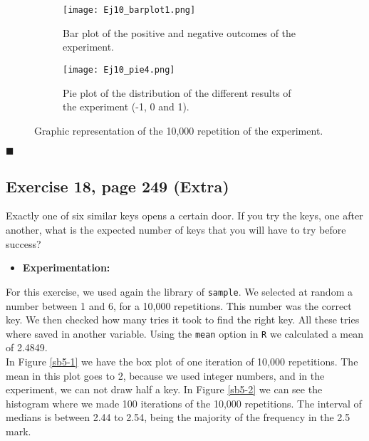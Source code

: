 \documentclass{article}
\begin{document}
\begin{figure}[]
\begin{subfigure}{.5\textwidth}
  \centering
  \texttt{[image: Ej10\_barplot1.png]}  
  \caption{Bar plot of the positive and negative outcomes of the experiment. }
  \label{sb4-1}
\end{subfigure}\hspace{5mm}%
\begin{subfigure}{.5\textwidth}
  \centering
  \texttt{[image: Ej10\_pie4.png]}  
  \caption{Pie plot of the distribution of the different results of the experiment (-1, 0 and 1).}
  \label{sb4-2}
\end{subfigure}
	\caption{Graphic representation of the 10,000 repetition of the experiment. }
\label{fig4}
\end{figure}

\begin{flushright}
$\blacksquare$
\end{flushright}

\subsection{Exercise 18, page 249 (Extra)}

Exactly one of six similar keys opens a certain door. If you try the keys, one after another, what is the expected number of keys that you will have to try before success?\\


\begin{itemize}
\item \textbf{Experimentation:}
\end{itemize}

For this exercise, we used again the library of \texttt{sample}. We selected at random a number between 1 and 6, for a 10,000 repetitions. This number was the correct key. We then checked how many tries it took to find the right key. All these tries where saved in another variable. Using the \texttt{mean} option in \texttt{R} we calculated a mean of 2.4849. \\

In Figure \ref{sb5-1} we have the box plot of one iteration of 10,000 repetitions. The mean in this plot goes to 2, because we used integer numbers, and in the experiment, we can not draw half a key. In Figure \ref{sb5-2} we can see the histogram where we made 100 iterations of the 10,000 repetitions. The interval of medians is between 2.44 to 2.54, being the majority of the frequency in the 2.5 mark.\\
\end{document}

